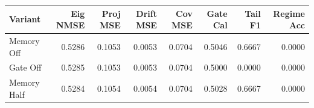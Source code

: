 \begin{tabular}{lrrrrrrr}
\toprule
Variant & Eig NMSE & Proj MSE & Drift MSE & Cov MSE & Gate Cal & Tail F1 & Regime Acc \\
\midrule
Memory Off & 0.5286 & 0.1053 & 0.0053 & 0.0704 & 0.5046 & 0.6667 & 0.0000 \\
Gate Off & 0.5285 & 0.1053 & 0.0053 & 0.0704 & 0.5000 & 0.0000 & 0.0000 \\
Memory Half & 0.5284 & 0.1054 & 0.0054 & 0.0704 & 0.5028 & 0.6667 & 0.0000 \\
\bottomrule
\end{tabular}